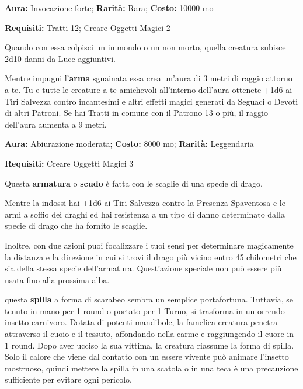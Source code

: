 \begin{multicols}{2}

\textbf{Aura:} Invocazione forte; \textbf{Rarità:} Rara; \textbf{Costo:} 10000 mo

\textbf{Requisiti:} Tratti  12; Creare Oggetti Magici 2

Quando con essa colpisci un immondo o un non morto, quella creatura subisce 2d10 danni da Luce aggiuntivi.

Mentre impugni l'\textbf{arma} sguainata essa crea un'aura di 3 metri di raggio attorno a te. Tu e tutte le creature a te amichevoli all'interno dell'aura ottenete +1d6 ai Tiri Salvezza contro incantesimi e altri effetti magici generati da Seguaci o Devoti di altri Patroni. Se hai Tratti in comune con il Patrono 13 o più, il raggio dell'aura aumenta a 9 metri.


\textbf{Aura:} Abiurazione moderata; \textbf{Costo:} 8000 mo; \textbf{Rarità:} Leggendaria

\textbf{Requisiti:} Creare Oggetti Magici 3

Questa \textbf{armatura} o \textbf{scudo} è fatta con le scaglie di una specie di drago.

Mentre la indossi hai +1d6 ai Tiri Salvezza contro la Presenza Spaventosa e le armi a soffio dei draghi ed hai resistenza a un tipo di danno determinato dalla specie di drago che ha fornito le scaglie.

Inoltre, con due azioni puoi focalizzare i tuoi sensi per determinare magicamente la distanza e la direzione in cui si trovi il drago più vicino entro 45 chilometri che sia della stessa specie dell'armatura. Quest'azione speciale non può essere più usata fino alla prossima alba.


questa \textbf{spilla} a forma di scarabeo sembra un semplice portafortuna. Tuttavia, se tenuto in mano per 1 round o portato per 1 Turno, si trasforma in un orrendo insetto carnivoro. Dotata di potenti mandibole, la famelica creatura penetra attraverso il cuoio e il tessuto, affondando nella carme e raggiungendo il cuore in 1 round. Dopo aver ucciso la sua vittima, la creatura riassume la forma di spilla. Solo il calore che viene dal contatto con un essere vivente può animare l'insetto mostruoso, quindi mettere la spilla in una scatola o in una teca è una precauzione sufficiente per evitare ogni pericolo.



\end{multicols}
